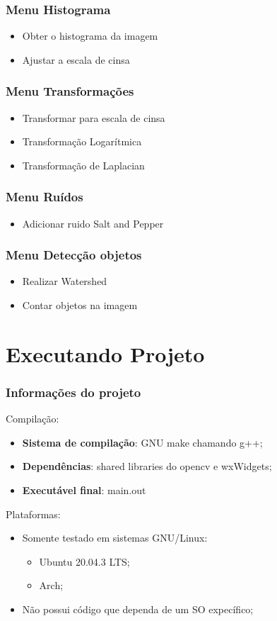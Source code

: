 \documentclass[12pt]{beamer}
\begin{document}
\begin{frame}
    \frametitle{Menu Histograma}
    \begin{itemize}
        \item Obter o histograma da imagem
        \item Ajustar a escala de cinsa
    \end{itemize}
\end{frame}

\begin{frame}
    \frametitle{Menu Transformações}
    \begin{itemize}
        \item Transformar para escala de cinsa
        \item Transformação Logarítmica
        \item Transformação de Laplacian
    \end{itemize}
\end{frame}

\begin{frame}
    \frametitle{Menu Ruídos}
    \begin{itemize}
        \item Adicionar ruido Salt and Pepper
    \end{itemize}
\end{frame}

\begin{frame}
    \frametitle{Menu Detecção objetos}
    \begin{itemize}
        \item Realizar Watershed
        \item Contar objetos na imagem
    \end{itemize}
\end{frame}

\section{Executando Projeto}
\begin{frame}
    \frametitle{Informações do projeto}
    {\large Compilação}:
    \begin{itemize}
        \item \textbf{Sistema de compilação}: GNU make chamando g++;
        \item \textbf{Dependências}: shared libraries do opencv e wxWidgets;
        \item \textbf{Executável final}: main.out
    \end{itemize}
    {\large Plataformas}:
    \begin{itemize}
        \item Somente testado em sistemas GNU/Linux:
        \begin{itemize}
            \item Ubuntu 20.04.3 LTS;
            \item Arch;
        \end{itemize}
        \item Não possui código que dependa de um SO expecífico;
    \end{itemize}
\end{frame}
\end{document}
